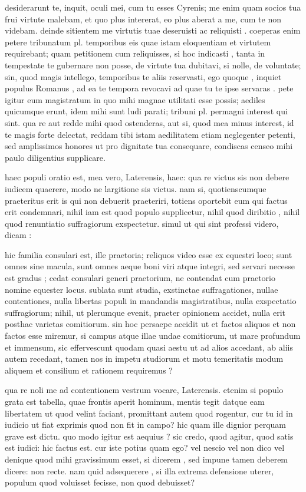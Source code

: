  desiderarunt te, inquit, oculi mei, cum tu esses Cyrenis; me enim quam socios tua frui virtute malebam, et quo plus intererat, eo plus aberat a me, cum te non videbam. deinde sitientem me virtutis tuae deseruisti ac reliquisti . coeperas enim petere tribunatum pl. temporibus eis quae istam eloquentiam et virtutem requirebant; quam petitionem cum reliquisses, si hoc indicasti , tanta in tempestate te gubernare non posse, de virtute tua dubitavi, si nolle, de voluntate; sin, quod magis intellego, temporibus te aliis reservasti, ego quoque , inquiet populus Romanus , ad ea te tempora revocavi ad quae tu te ipse servaras . pete igitur eum magistratum in quo mihi magnae utilitati esse possis; aediles quicumque erunt, idem mihi sunt ludi parati; tribuni pl. permagni interest qui sint. qua re aut redde mihi quod ostenderas, aut si, quod mea minus interest, id te magis forte delectat, reddam tibi istam aedilitatem etiam neglegenter petenti, sed amplissimos honores ut pro dignitate tua consequare, condiscas censeo mihi paulo diligentius supplicare.

 haec populi oratio est, mea vero, Laterensis, haec: qua re victus sis non debere iudicem quaerere, modo ne largitione sis victus. nam si, quotienscumque praeteritus erit is qui non debuerit praeteriri, totiens oportebit eum qui factus erit condemnari, nihil iam est quod populo supplicetur, nihil quod diribitio , nihil quod renuntiatio suffragiorum exspectetur. simul ut qui sint professi videro, dicam :

 hic familia consulari est, ille praetoria; reliquos video esse ex equestri loco; sunt omnes sine macula, sunt omnes aeque boni viri atque integri, sed servari necesse est gradus ; cedat consulari generi praetorium, ne contendat cum praetorio nomine equester locus. sublata sunt studia, exstinctae suffragationes, nullae contentiones, nulla libertas populi in mandandis magistratibus, nulla exspectatio suffragiorum; nihil, ut plerumque evenit, praeter opinionem accidet, nulla erit posthac varietas comitiorum. sin hoc persaepe accidit ut et factos aliquos et non factos esse miremur, si campus atque illae undae comitiorum, ut mare profundum et immensum, sic effervescunt quodam quasi aestu ut ad alios accedant, ab aliis autem recedant, tamen nos in impetu studiorum et motu temeritatis modum aliquem et consilium et rationem requiremus ?

 qua re noli me ad contentionem vestrum vocare, Laterensis. etenim si populo grata est tabella, quae frontis aperit hominum, mentis tegit datque eam libertatem ut quod velint faciant, promittant autem quod rogentur, cur tu id in iudicio ut fiat exprimis quod non fit in campo? hic quam ille dignior perquam grave est dictu. quo modo igitur est aequius ? sic credo, quod agitur, quod satis est iudici: hic factus est. cur iste potius quam ego? vel nescio vel non dico vel denique quod mihi gravissimum esset, si dicerem , sed impune tamen deberem dicere: non recte. nam quid adsequerere , si illa extrema defensione uterer, populum quod voluisset fecisse, non quod debuisset?

